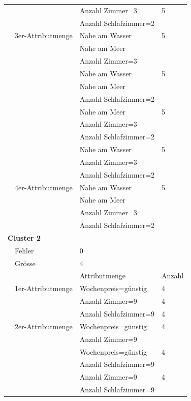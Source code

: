 \begin{longtable}{ | l | l | l | l |}
	& & \tabitem Anzahl Zimmer=3 & 5 \\
	& & \tabitem Anzahl Schlafzimmer=2 & \\ \cline{2-4} 
	
	& 3er-Attributmenge & \tabitem Nahe am Wasser & 5 \\
	& & \tabitem Nahe am Meer & \\ 
	& & \tabitem Anzahl Zimmer=3 & \\ \cline{3-4} 
	& & \tabitem Nahe am Wasser & 5 \\
	& & \tabitem Nahe am Meer & \\ 
	& & \tabitem Anzahl Schlafzimmer=2 & \\ \cline{3-4}
	& & \tabitem Nahe am Meer & 5 \\
	& & \tabitem Anzahl Zimmer=3 & \\ 
	& & \tabitem Anzahl Schlafzimmer=2 & \\ \cline{3-4}
	& & \tabitem Nahe am Wasser & 5 \\
	& & \tabitem Anzahl Zimmer=3 & \\ 
	& & \tabitem Anzahl Schlafzimmer=2 & \\ \cline{2-4}
	
	& 4er-Attributmenge & \tabitem Nahe am Wasser & 5 \\
	& & \tabitem Nahe am Meer & \\ 
	& & \tabitem Anzahl Zimmer=3 & \\ 
	& & \tabitem Anzahl Schlafzimmer=2 & \\ \hline
	
	\multicolumn{4}{|l|}{\textbf{Cluster 2}} \\ \cline{2-4} 
	& Fehler & \multicolumn{2}{|l|}{0} \\ \cline{2-4} 
	& Grösse & \multicolumn{2}{|l|}{4} \\ \cline{2-4} 
	& & Attributmenge & Anzahl \\ \cline{2-4} 
	
	& 1er-Attributmenge & \tabitem Wochenpreis=günstig & 4 \\ \cline{3-4}
	& & \tabitem Anzahl Zimmer=9 & 4 \\ \cline{3-4}
	& & \tabitem Anzahl Schlafzimmer=9 & 4 \\ \cline{2-4} 
	
	& 2er-Attributmenge & \tabitem Wochenpreis=günstig & 4 \\
	& & \tabitem Anzahl Zimmer=9 & \\ \cline{3-4}
	& & \tabitem Wochenpreis=günstig & 4 \\
	& & \tabitem Anzahl Schlafzimmer=9 & \\ \cline{3-4} 
	& & \tabitem Anzahl Zimmer=9 & 4 \\
	& & \tabitem Anzahl Schlafzimmer=9 & \\ \cline{2-4}
	

\end{longtable}
